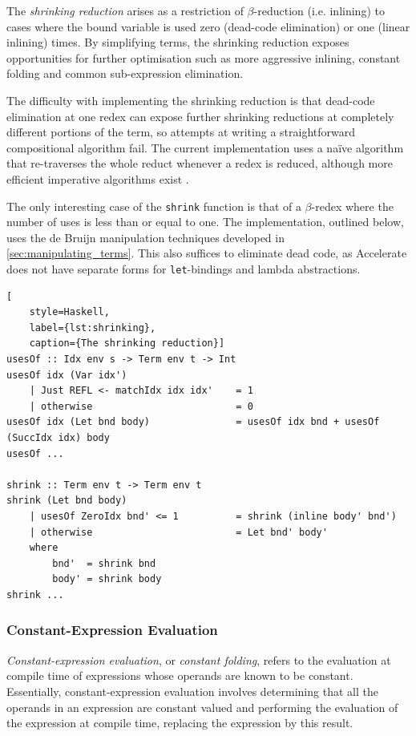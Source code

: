 The \emph{shrinking reduction} arises as a restriction of $\beta$-reduction
(i.e. inlining) to cases where the bound variable is used zero (dead-code
elimination) or one (linear inlining) times. By simplifying terms,
the shrinking reduction exposes opportunities for further optimisation such as
more aggressive inlining, constant folding and common sub-expression
elimination. %

The difficulty with implementing the shrinking reduction is that dead-code
elimination at one redex can expose further shrinking reductions at completely
different portions of the term, so attempts at writing a straightforward
compositional algorithm fail. The current implementation uses a na\"ive
algorithm that re-traverses the whole reduct whenever a redex is reduced,
although more efficient imperative algorithms exist
\cite{Appel:1997gs,Benton:2004ua,Kennedy:2007cb}.

The only interesting case of the \texttt{shrink} function is that of a
$\beta$-redex where the number of uses is less than or equal to one. The
implementation, outlined below, uses the de Bruijn manipulation techniques
developed in \autoref{sec:manipulating_terms}. This also suffices to eliminate
dead code, as Accelerate does not have separate forms for \texttt{let}-bindings
and lambda abstractions.
%
\begin{lstlisting}[
    style=Haskell,
    label={lst:shrinking},
    caption={The shrinking reduction}]
usesOf :: Idx env s -> Term env t -> Int
usesOf idx (Var idx')
    | Just REFL <- matchIdx idx idx'    = 1
    | otherwise                         = 0
usesOf idx (Let bnd body)               = usesOf idx bnd + usesOf (SuccIdx idx) body
usesOf ...

shrink :: Term env t -> Term env t
shrink (Let bnd body)
    | usesOf ZeroIdx bnd' <= 1          = shrink (inline body' bnd')
    | otherwise                         = Let bnd' body'
    where
        bnd'  = shrink bnd
        body' = shrink body
shrink ...
\end{lstlisting}


\subsubsection{Constant-Expression Evaluation}

\emph{Constant-expression evaluation}, or \emph{constant folding}, refers to the
evaluation at compile time of expressions whose operands are known to be
constant. Essentially, constant-expression evaluation involves determining that
all the operands in an expression are constant valued and performing the
evaluation of the expression at compile time, replacing the expression by this
result.

